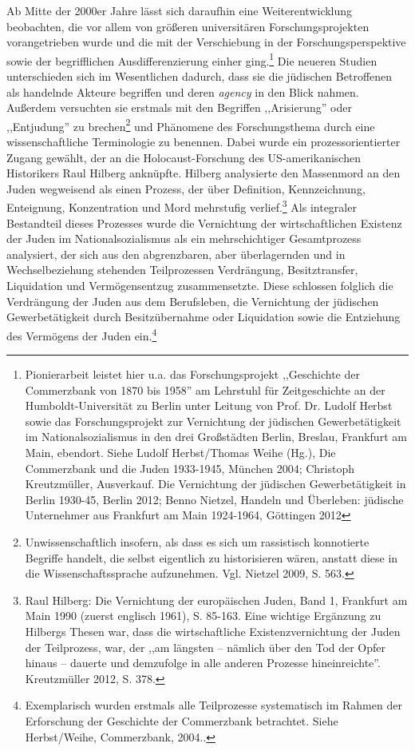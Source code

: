 Ab Mitte der 2000er Jahre lässt sich daraufhin eine Weiterentwicklung beobachten, die vor allem von größeren universitären Forschungsprojekten vorangetrieben wurde und die mit der Verschiebung in der Forschungsperspektive sowie der begrifflichen Ausdifferenzierung einher ging.\footnote{Pionierarbeit leistet hier u.a. das Forschungsprojekt ,,Geschichte der Commerzbank von 1870 bis 1958'' am Lehrstuhl für Zeitgeschichte an der Humboldt-Universität zu Berlin unter Leitung von Prof. Dr. Ludolf Herbst sowie das Forschungsprojekt zur Vernichtung der jüdischen Gewerbetätigkeit im Nationalsozialismus in den drei Großstädten Berlin, Breslau, Frankfurt am Main, ebendort. Siehe Ludolf Herbst/Thomas Weihe (Hg.), Die Commerzbank und die Juden 1933-1945, München 2004; Christoph Kreutzmüller, Ausverkauf. Die Vernichtung der jüdischen Gewerbetätigkeit in Berlin 1930-45, Berlin 2012; Benno Nietzel, Handeln und Überleben: jüdische Unternehmer aus Frankfurt am Main 1924-1964, Göttingen 2012} Die neueren Studien unterschieden sich im Wesentlichen dadurch, dass sie die jüdischen Betroffenen als handelnde Akteure begriffen und deren \textit{agency} in den Blick nahmen. Außerdem versuchten sie erstmals mit den Begriffen ,,Arisierung'' oder ,,Entjudung'' zu brechen\footnote{Unwissenschaftlich insofern, als dass es sich um rassistisch konnotierte Begriffe handelt, die selbst eigentlich zu historisieren wären, anstatt diese in die Wissenschaftssprache aufzunehmen. Vgl. Nietzel 2009, S. 563.} und Phänomene des Forschungsthema durch eine wissenschaftliche Terminologie zu benennen. Dabei wurde ein prozessorientierter Zugang gewählt, der an die Holocaust-Forschung des US-amerikanischen Historikers Raul Hilberg anknüpfte. Hilberg analysierte den Massenmord an den Juden wegweisend als einen Prozess, der über Definition, Kennzeichnung, Enteignung, Konzentration und Mord mehrstufig verlief.\footnote{Raul Hilberg: Die Vernichtung der europäischen Juden, Band 1, Frankfurt am Main 1990 (zuerst englisch 1961), S. 85-163. Eine wichtige Ergänzung zu Hilbergs Thesen war, dass die wirtschaftliche Existenzvernichtung der Juden der Teilprozess, war, der ,,am längsten – nämlich über den Tod der Opfer hinaus – dauerte und demzufolge in alle anderen Prozesse hineinreichte''. Kreutzmüller 2012, S. 378.} Als integraler Bestandteil dieses Prozesses wurde die Vernichtung der wirtschaftlichen Existenz der Juden im Nationalsozialismus als ein mehrschichtiger Gesamtprozess analysiert, der sich aus den abgrenzbaren, aber überlagernden und in Wechselbeziehung stehenden Teilprozessen Verdrängung, Besitztransfer, Liquidation und Vermögensentzug zusammensetzte. Diese schlossen folglich die Verdrängung der Juden aus dem Berufsleben, die Vernichtung der jüdischen Gewerbetätigkeit durch Besitzübernahme oder Liquidation sowie die Entziehung des Vermögens der Juden ein.\footnote{Exemplarisch wurden erstmals alle Teilprozesse systematisch im Rahmen der Erforschung der Geschichte der Commerzbank betrachtet. Siehe Herbst/Weihe, Commerzbank, 2004..}

